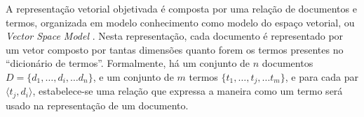 \documentclass[
    12pt,                %
    oneside,            %
    a4paper,            %
    english,            %
    brazil                %
    ]{abntex2ppgsi}
\begin{document}


A representação vetorial objetivada é composta por uma relação de documentos e termos, organizada em modelo conhecimento como modelo do espaço vetorial, ou \textit{Vector Space Model} \cite{Salton1975,Sebastiani2002,Lops2011}. Nesta representação, cada documento é representado por um vetor composto por tantas dimensões quanto forem os termos presentes no ``dicionário de termos''. Formalmente, há um conjunto de $n$ documentos $D = \{ d_1, \dots, d_i, \dots d_n \}$, e um conjunto de $m$ termos $\{ t_1, \dots, t_j, \dots t_m \}$, e para cada par $\langle t_j, d_i \rangle$, estabelece-se uma relação que expressa a maneira como um termo será usado na representação de um documento.
\end{document}
